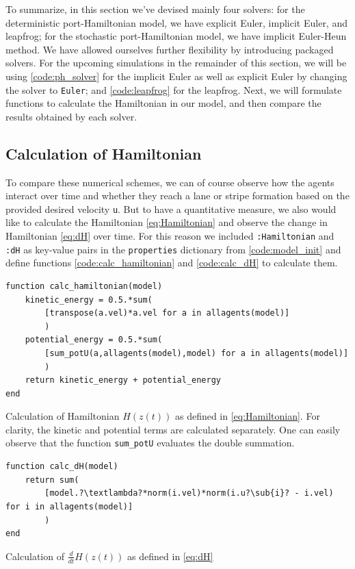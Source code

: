 To summarize, in this section we've devised mainly four solvers: for the deterministic port-Hamiltonian model, we have explicit Euler, implicit Euler, and leapfrog; for the stochastic port-Hamiltonian model, we have implicit Euler-Heun method. We have allowed ourselves further flexibility by introducing packaged solvers. For the upcoming simulations in the remainder of this section, we will be using \autoref{code:ph_solver} for the implicit Euler as well as explicit Euler by changing the solver to \texttt{Euler}; and \autoref{code:leapfrog} for the leapfrog. Next, we will formulate functions to calculate the Hamiltonian in our model, and then compare the results obtained by each solver.

\subsection{Calculation of Hamiltonian}
\label{section:calc_ham}

To compare these numerical schemes, we can of course observe how the agents interact over time and whether they reach a lane or stripe formation based on the provided desired velocity \texttt{u}. But to have a quantitative measure, we also would like to calculate the Hamiltonian \autoref{eq:Hamiltonian} and observe the change in Hamiltonian \autoref{eq:dH} over time. For this reason we included \texttt{:Hamiltonian} and \texttt{:dH} as key-value pairs in the \texttt{properties} dictionary from \autoref{code:model_init} and define functions \autoref{code:calc_hamiltonian} and \autoref{code:calc_dH} to calculate them.

\begin{listing}[H]
\begin{verbatim}    
function calc_hamiltonian(model)
    kinetic_energy = 0.5.*sum(
        [transpose(a.vel)*a.vel for a in allagents(model)]
        )
    potential_energy = 0.5.*sum(
        [sum_potU(a,allagents(model),model) for a in allagents(model)]
        )
    return kinetic_energy + potential_energy
end
\end{verbatim}
\caption{Calculation of Hamiltonian $H(z(t))$ as defined in \autoref{eq:Hamiltonian}. For clarity, the kinetic and potential terms are calculated separately. One can easily observe that the function \texttt{sum\_potU} evaluates the double summation.}
\label{code:calc_hamiltonian}
\end{listing}

\begin{listing}[H]
\begin{verbatim}    
function calc_dH(model)
    return sum(
        [model.?\textlambda?*norm(i.vel)*norm(i.u?\sub{i}? - i.vel) for i in allagents(model)]
        )
end
\end{verbatim}
\caption{Calculation of $\frac{d}{dt}H(z(t))$ as defined in \autoref{eq:dH}}
\label{code:calc_dH}
\end{listing}

